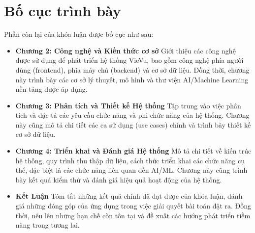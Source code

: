 \section{Bố cục trình bày}
Phần còn lại của khóa luận được bố cục như sau:
\begin{itemize}
    \item \textbf{Chương 2: Công nghệ và Kiến thức cơ sở}\nl
    Giới thiệu các công nghệ được sử dụng để phát triển hệ thống VieVu, bao gồm công nghệ phía người dùng (frontend), phía máy chủ (backend) và cơ sở dữ liệu. Đồng thời, chương này trình bày các cơ sở lý thuyết, mô hình và thư viện AI/Machine Learning nền tảng được áp dụng.

    \item \textbf{Chương 3: Phân tích và Thiết kế Hệ thống}\nl
    Tập trung vào việc phân tích và đặc tả các yêu cầu chức năng và phi chức năng của hệ thống. Chương này cũng mô tả chi tiết các ca sử dụng (use cases) chính và trình bày thiết kế cơ sở dữ liệu.

    \item \textbf{Chương 4: Triển khai và Đánh giá Hệ thống}\nl
    Mô tả chi tiết về kiến trúc hệ thống, quy trình thu thập dữ liệu, cách thức triển khai các chức năng cụ thể, đặc biệt là các chức năng liên quan đến AI/ML. Chương này cũng trình bày kết quả kiểm thử và đánh giá hiệu quả hoạt động của hệ thống.

    \item \textbf{Kết Luận}\nl
    Tóm tắt những kết quả chính đã đạt được của khóa luận, đánh giá những đóng góp của ứng dụng trong việc giải quyết bài toán đặt ra. Đồng thời, nêu lên những hạn chế còn tồn tại và đề xuất các hướng phát triển tiềm năng trong tương lai.
\end{itemize}